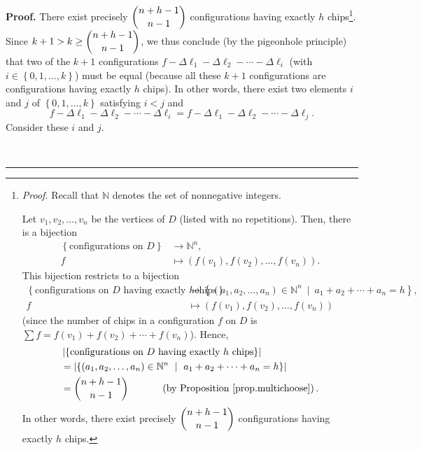\documentclass[numbers=enddot,12pt,final,onecolumn,notitlepage]{scrartcl}%
\theoremstyle{definition}
\newenvironment{proof}[1][Proof]{\noindent\textbf{#1.} }{\ \rule{0.5em}{0.5em}}
\let\sumnonlimits\sum
\renewcommand{\sum}{\sumnonlimits\limits}
\begin{document}
\begin{proof}
There exist precisely $\dbinom{n+h-1}{n-1}$ configurations having exactly $h$
chips\footnote{\textit{Proof.} Recall that $\mathbb{N}$ denotes the set of
nonnegative integers.
\par
Let $v_{1},v_{2},\ldots,v_{n}$ be the vertices of $D$ (listed with no
repetitions). Then, there is a bijection%
\begin{align*}
\left\{  \text{configurations on }D\right\}   &  \rightarrow\mathbb{N}^{n},\\
f  &  \mapsto\left(  f\left(  v_{1}\right)  ,f\left(  v_{2}\right)
,\ldots,f\left(  v_{n}\right)  \right)  .
\end{align*}
This bijection restricts to a bijection%
\begin{align*}
\left\{  \text{configurations on }D\text{ having exactly }h\text{
chips}\right\}   &  \rightarrow\left\{  \left(  a_{1},a_{2},\ldots
,a_{n}\right)  \in\mathbb{N}^{n}\ \mid\ a_{1}+a_{2}+\cdots+a_{n}=h\right\}
,\\
f  &  \mapsto\left(  f\left(  v_{1}\right)  ,f\left(  v_{2}\right)
,\ldots,f\left(  v_{n}\right)  \right)
\end{align*}
(since the number of chips in a configuration $f$ on $D$ is $\sum f=f\left(
v_{1}\right)  +f\left(  v_{2}\right)  +\cdots+f\left(  v_{n}\right)  $).
Hence,%
\begin{align*}
&  \left\vert \left\{  \text{configurations on }D\text{ having exactly
}h\text{ chips}\right\}  \right\vert \\
&  =\left\vert \left\{  \left(  a_{1},a_{2},\ldots,a_{n}\right)  \in
\mathbb{N}^{n}\ \mid\ a_{1}+a_{2}+\cdots+a_{n}=h\right\}  \right\vert \\
&  =\dbinom{n+h-1}{n-1}\ \ \ \ \ \ \ \ \ \ \left(  \text{by Proposition
\ref{prop.multichoose}}\right)  .
\end{align*}
In other words, there exist precisely $\dbinom{n+h-1}{n-1}$ configurations
having exactly $h$ chips.}. Since $k+1>k\geq\dbinom{n+h-1}{n-1}$, we thus
conclude (by the pigeonhole principle) that two of the $k+1$ configurations
$f-\Delta\ell_{1}-\Delta\ell_{2}-\cdots-\Delta\ell_{i}$ (with $i\in\left\{
0,1,\ldots,k\right\}  $) must be equal (because all these $k+1$ configurations
are configurations having exactly $h$ chips). In other words, there exist two
elements $i$ and $j$ of $\left\{  0,1,\ldots,k\right\}  $ satisfying $i<j$ and%
\begin{equation}
f-\Delta\ell_{1}-\Delta\ell_{2}-\cdots-\Delta\ell_{i}=f-\Delta\ell_{1}%
-\Delta\ell_{2}-\cdots-\Delta\ell_{j}. \label{sol.chip.better-bounds.ivsj}%
\end{equation}
Consider these $i$ and $j$.


\end{proof}
\end{document}

